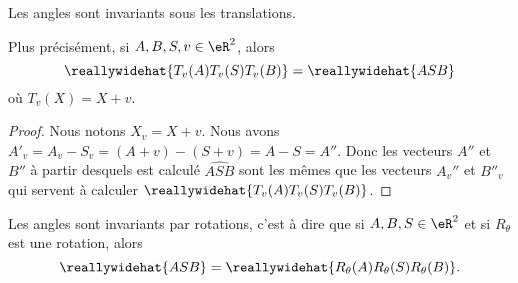 \begin{proposition}      \label{PROPooKVSHooRODGWE}
    Les angles sont invariants sous les translations. 

    Plus précisément, si \( A,B,S,v\in \eR^2\), alors
    \begin{equation}
        \reallywidehat{T_v(A)T_v(S)T_v(B)}=\reallywidehat{ASB}
    \end{equation}
    où \( T_v(X)=X+v\).
\end{proposition}

\begin{proof}
    Nous notons \( X_v=X+v\). Nous avons \( A'_v=A_v-S_v=(A+v)-(S+v)=A-S=A''\). Donc les vecteurs \( A''\) et \( B''\) à partir desquels est calculé \( \widehat{ASB}\) sont les mêmes que les vecteurs \(  A_v'' \) et \( B''_v\) qui servent à calculer \( \reallywidehat{T_v(A)T_v(S)T_v(B)}\).
\end{proof}

\begin{proposition}      \label{PROPooYWKJooRjybUJ}
    Les angles sont invariants par rotations, c'est à dire que si \( A,B,S\in \eR^2\) et si \( R_{\theta}\) est une rotation, alors
    \begin{equation}
        \reallywidehat{ASB}=\reallywidehat{R_{\theta}(A)R_{\theta}(S)R_{\theta}(B)}.
    \end{equation}
\end{proposition}

